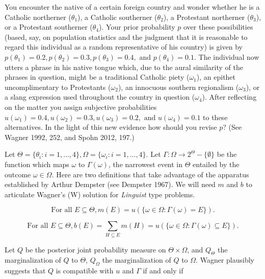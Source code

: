 \documentclass[12pt]{article}
\begin{document}
\begin{quotex}
  You encounter the native of a certain foreign country and wonder
  whether he is a Catholic northerner ($\theta_{1}$), a Catholic
  southerner ($\theta_{2}$), a Protestant northerner ($\theta_{3}$),
  or a Protestant southerner ($\theta_{4}$). Your prior probability
  $p$ over these possibilities (based, say, on population statistics
  and the judgment that it is reasonable to regard this individual as
  a random representative of his country) is given by
  $p(\theta_{1})=0.2,p(\theta_{2})=0.3,p(\theta_{3})=0.4,\mbox{ and
  }p(\theta_{4})=0.1$. The individual now utters a phrase in his
  native tongue which, due to the aural similarity of the phrases in
  question, might be a traditional Catholic piety ($\omega_{1}$), an
  epithet uncomplimentary to Protestants ($\omega_{2}$), an innocuous
  southern regionalism ($\omega_{3}$), or a slang expression used
  throughout the country in question ($\omega_{4}$). After reflecting
  on the matter you assign subjective probabilities
  $u(\omega_{1})=0.4,u(\omega_{2})=0.3,u(\omega_{3})=0.2,\mbox{ and
  }u(\omega_{4})=0.1$ to these alternatives. In the light of this new
  evidence how should you revise $p$? (See Wagner 1992, 252,
  and Spohn 2012, 197.)
\end{quotex}

Let
$\Theta=\{\theta_{i}:i=1,\ldots,4\},\Omega=\{\omega_{i}:i=1,\ldots,4\}$.
Let $\Gamma:\Omega\rightarrow{}2^{\Theta}-\{\emptyset\}$ be the
function which maps $\omega$ to $\Gamma(\omega)$, the narrowest event
in $\Theta$ entailed by the outcome $\omega\in\Omega$. Here are two
definitions that take advantage of the apparatus established by Arthur
Dempster (see Dempster 1967). We will need $m$ and $b$ to
articulate Wagner's (W) solution for \emph{Linguist} type problems.

\begin{equation}
  \mbox{For all }E\subseteq{}\Theta, m(E)=u(\{\omega\in\Omega:\Gamma(\omega)=E\})\label{eq:mof}.
\end{equation}

\begin{equation}
  \mbox{For all }E\subseteq{}\Theta, b(E)=\sum_{H\subseteq{}E}m(H)=u(\{\omega\in\Omega:\Gamma(\omega)\subseteq{}E\})\label{eq:bof}.
\end{equation}

Let $Q$ be the posterior joint probability measure on
$\Theta\times\Omega$, and $Q_{\Theta}$ the marginalization of $Q$ to
$\Theta$, $Q_{\Omega}$ the marginalization of $Q$ to $\Omega$.
Wagner plausibly suggests that $Q$ is compatible with $u$ and $\Gamma$
if and only if
\end{document}
